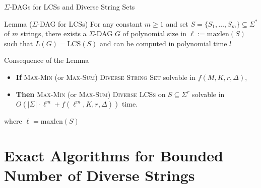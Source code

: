 \documentclass{beamer}
\begin{document}
\begin{frame}{$\Sigma$-DAGs for LCSs and Diverse String Sets}

    \begin{block}{Lemma ($\Sigma$-DAG for LCSs)}
        For any constant \( m \geq 1 \) and set \( S = \{S_1, \dots, S_m\} \subseteq \Sigma^* \) of \( m \) strings, there exists a $\Sigma$-DAG \( G \) of polynomial size in \( \ell := \text{maxlen}(S) \) such that \( L(G) = \text{LCS}(S) \) and can be computed in polynomial time $l$\\
    \end{block}


    \begin{exampleblock}{Consequence of the Lemma}
        \begin{itemize}
            \item \textbf{If} \textsc{Max-Min} (or \textsc{Max-Sum}) \textsc{Diverse String Set} solvable in \( f(M, K, r, \Delta) \),
            \item \textbf{Then} \textsc{Max-Min} (or \textsc{Max-Sum}) \textsc{Diverse LCSs} on \( S \subseteq \Sigma^r \) solvable in \( O(|\Sigma| \cdot \ell^m + f(\ell^m, K, r, \Delta)) \) time.
        \end{itemize}
        where \( \ell = \text{maxlen}(S) \)
    \end{exampleblock}

\end{frame}


\section{Exact Algorithms for Bounded Number of Diverse Strings}
\end{document}
